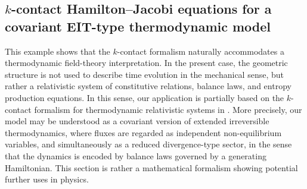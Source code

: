 \documentclass[11pt,twoside]{article}
\theoremstyle{plain}
\theoremstyle{definition}
\theoremstyle{remark}
\begin{document}
\subsection{\texorpdfstring{$k$}{}-contact Hamilton--Jacobi equations for a covariant EIT-type thermodynamic model}\label{subsec:thermo_EIT_reducedDTT}

This example shows that the $k$-contact formalism naturally accommodates a thermodynamic field-theory interpretation. In the present case, the geometric structure is not used to describe time evolution in the mechanical sense, but rather a  relativistic system of constitutive relations, balance laws, and entropy production equations. In this sense, our application is partially based on the $k$-contact formalism for thermodynamic relativistic systems in \cite{HLM_26}. More precisely, our model may be understood as a covariant version of extended irreversible thermodynamics, where fluxes are regarded as independent non-equilibrium variables, and simultaneously as a reduced divergence-type sector, in the sense that the dynamics is encoded by balance laws governed by a generating Hamiltonian. This section is rather a mathematical formalism showing potential further uses in physics.  
\end{document}
